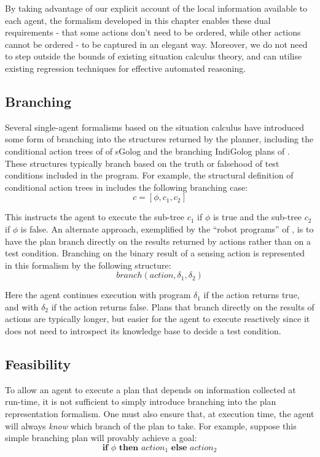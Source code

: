 By taking advantage of our explicit account of the local information
available to each agent, the formalism developed in this chapter enables
these dual requirements - that some actions don't need to be ordered,
while other actions cannot be ordered - to be captured in an elegant
way. Moreover, we do not need to step outside the bounds of existing
situation calculus theory, and can utilise existing regression techniques
for effective automated reasoning.


\subsection{Branching}

Several single-agent formalisms based on the situation calculus have
introduced some form of branching into the structures returned by
the planner, including the conditional action trees of of sGolog \citep{lakemeyer99golog_cats}
and the branching IndiGolog plans of \citep{giacomo04sem_delib_indigolog}.
These structures typically branch based on the truth or falsehood
of test conditions included in the program. For example, the structural
definition of conditional action trees in \citep{lakemeyer99golog_cats}
includes the following branching case:\[
c=[\phi,c_{1},c_{2}]\]


This instructs the agent to execute the sub-tree $c_{1}$ if $\phi$
is true and the sub-tree $c_{2}$ if $\phi$ is false. An alternate
approach, exemplified by the {}``robot programs'' of \citet{levesque98what_robots_can_do},
is to have the plan branch directly on the results returned by actions
rather than on a test condition. Branching on the binary result of
a sensing action is represented in this formalism by the following
structure:\[
branch(action,\delta_{1},\delta_{2})\]


Here the agent continues execution with program $\delta_{1}$ if the
action returns true, and with $\delta_{2}$ if the action returns
false. Plans that branch directly on the results of actions are typically
longer, but easier for the agent to execute reactively since it does
not need to introspect its knowledge base to decide a test condition.


\subsection{Feasibility\label{sec:JointExec:BG:Feasibility}}

To allow an agent to execute a plan that depends on information collected
at run-time, it is not sufficient to simply introduce branching into
the plan representation formalism. One must also ensure that, at execution
time, the agent will always \emph{know} which branch of the plan to
take. For example, suppose this simple branching plan will provably
achieve a goal:\[
\mathbf{if}\,\,\phi\,\,\mathbf{then}\,\, action_{1}\,\,\mathbf{else\,}\, action_{2}\]


